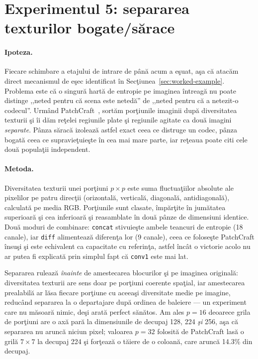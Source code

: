 \section{Experimentul 5: separarea texturilor bogate/sărace}
\label{sec:exp-texture}

\paragraph{Ipoteza.} Fiecare schimbare a etajului de intrare de până acum a
eşuat, aşa că atacăm direct mecanismul de eşec identificat în
Secţiunea~\ref{sec:worked-example}. Problema este că o singură hartă de entropie
pe imaginea întreagă nu poate distinge ,,neted pentru că scena este netedă'' de
,,neted pentru că a netezit-o codecul''. Urmând PatchCraft~\cite{zhong2024patchcraft},
sortăm porţiunile imaginii după diversitatea texturii şi îi dăm reţelei regiunile
plate şi regiunile agitate ca două imagini \emph{separate}. Pânza săracă
izolează astfel exact ceea ce distruge un codec, pânza bogată ceea ce
supravieţuieşte în cea mai mare parte, iar reţeaua poate citi cele două populaţii
independent.

\paragraph{Metoda.} Diversitatea texturii unei porţiuni $p\times p$ este suma
fluctuaţiilor absolute ale pixelilor pe patru direcţii (orizontală, verticală,
diagonală, antidiagonală), calculată pe media RGB. Porţiunile sunt clasate,
împărţite în jumătatea superioară şi cea inferioară şi reasamblate în două pânze
de dimensiuni identice. Două moduri de combinare: \texttt{concat} stivuieşte
ambele teancuri de entropie (18 canale), iar \texttt{diff} alimentează diferenţa
lor (9 canale), ceea ce foloseşte PatchCraft însuşi şi este echivalent ca
capacitate cu referinţa, astfel încât o victorie acolo nu ar putea fi explicată
prin simplul fapt că \texttt{conv1} este mai lat.

Separarea rulează \emph{înainte} de amestecarea blocurilor şi pe imaginea
originală: diversitatea texturii are sens doar pe porţiuni coerente spaţial, iar
amestecarea prealabilă ar lăsa fiecare porţiune cu aceeaşi diversitate medie pe
imagine, reducând separarea la o departajare după ordinea de baleiere --- un
experiment care nu măsoară nimic, deşi arată perfect sănătos. Am ales $p=16$
deoarece grila de porţiuni are o axă pară la dimensiunile de decupaj 128, 224
\emph{şi} 256, aşa că separarea nu aruncă niciun pixel; valoarea $p=32$ folosită
de PatchCraft lasă o grilă $7\times7$ la decupaj 224 şi forţează o tăiere de o
coloană, care aruncă 14.3\% din decupaj.

